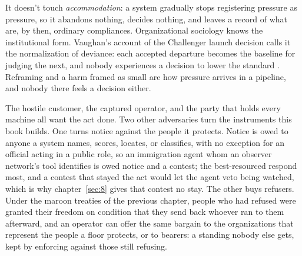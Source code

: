 It doesn't touch \emph{accommodation}: a system gradually stops registering pressure as pressure, so it abandons nothing, decides nothing, and leaves a record of what are, by then, ordinary compliances. Organizational sociology knows the institutional form. Vaughan's account of the Challenger launch decision calls it the normalization of deviance: each accepted departure becomes the baseline for judging the next, and nobody experiences a decision to lower the standard \autocite{vaughan1996challenger}. Reframing and a harm framed as small are how pressure arrives in a pipeline, and nobody there feels a decision either.

The hostile customer, the captured operator, and the party that holds every machine all want the act done. Two other adversaries turn the instruments this book builds. One turns notice against the people it protects. Notice is owed to anyone a system names, scores, locates, or classifies, with no exception for an official acting in a public role, so an immigration agent whom an observer network's tool identifies is owed notice and a contest; the best-resourced respond most, and a contest that stayed the act would let the agent veto being watched, which is why chapter~\ref{sec:8} gives that contest no stay. The other buys refusers. Under the maroon treaties of the previous chapter, people who had refused were granted their freedom on condition that they send back whoever ran to them afterward, and an operator can offer the same bargain to the organizations that represent the people a floor protects, or to bearers: a standing nobody else gets, kept by enforcing against those still refusing.

